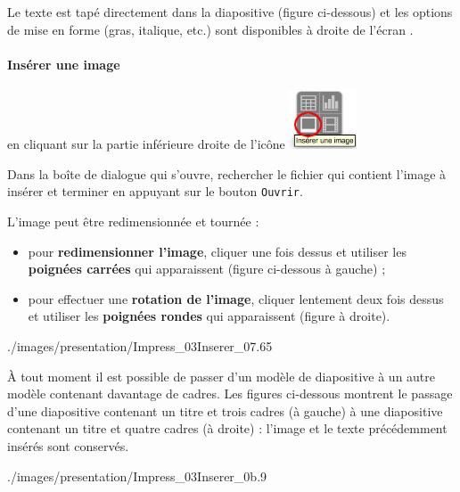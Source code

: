 Le texte est tapé directement dans la diapositive  (figure ci-dessous) et les options de mise en forme (gras, italique, etc.) sont disponibles à droite de l'écran . 



\paragraph{Insérer une image} en cliquant sur la partie inférieure droite de l'icône \includegraphics[width=2cm]{./images/presentation/Impress_03Inserer_01}

Dans la boîte de dialogue qui s'ouvre, rechercher le fichier qui contient l'image à insérer et terminer en appuyant sur le bouton \texttt{Ouvrir}.

\vspace{1em}

L'image peut être redimensionnée et tournée :\label{poigneeTourneZoom} 

\begin{itemize}
\item pour \textbf{redimensionner l'image}, cliquer une fois dessus et utiliser les \textbf{poignées carrées} qui apparaissent (figure ci-dessous à gauche) ;
\item pour effectuer une \textbf{rotation de l'image}, cliquer lentement deux fois dessus et utiliser les \textbf{poignées rondes} qui apparaissent (figure à droite).
\end{itemize}

	      {./images/presentation/Impress_03Inserer_07}{.65\textwidth}




À tout moment il est possible de passer d'un modèle de diapositive à un autre modèle contenant davantage de cadres. Les figures ci-dessous montrent le passage d'une diapositive contenant un titre et trois cadres (à gauche) à une diapositive contenant un titre et quatre cadres (à droite) : l'image et le texte précédemment insérés sont conservés.

              {./images/presentation/Impress_03Inserer_0b}{.9\textwidth}









